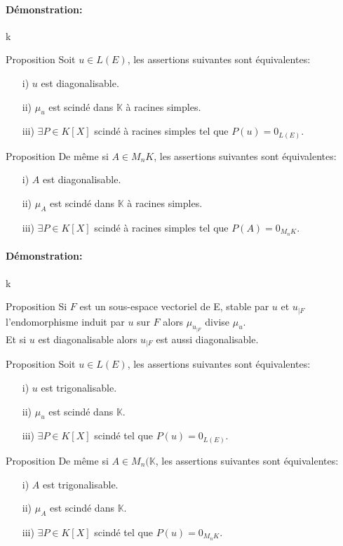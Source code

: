 \documentclass{book}
\begin{document}
\paragraph{Démonstration:}
k
\begin{Propriété}[]{Proposition}{}
Soit \(u \in L(E)\), les assertions suivantes sont équivalentes:
\begin{itemize}
    \item[i)] \(u\) est diagonalisable.
    \item[ii)] \(\mu_{u}\) est scindé dans \(\mathbb{K}\) à racines simples.
    \item[iii)] \(\exists P \in K[X]\) scindé à racines simples tel que \(P(u)=0_{L(E)}\).
\end{itemize}
\end{Propriété}
\begin{Propriété}[]{Proposition}{}
De même si \(A \in M_n{K}\), les assertions suivantes sont équivalentes:
\begin{itemize}
    \item[i)] \(A\) est diagonalisable.
    \item[ii)] \(\mu_{A}\) est scindé dans \(\mathbb{K}\) à racines simples.
    \item[iii)] \(\exists P \in K[X]\) scindé à racines simples tel que \(P(A)=0_{M_n{K}}\).
\end{itemize}
\end{Propriété}
\paragraph{Démonstration:}
k
\begin{Propriété}[]{Proposition}{}
Si \(F\) est un sous-espace vectoriel de E, stable par \(u\) et \(u_{|F}\) l'endomorphisme induit par \(u\) sur \(F\) alors \(\mu_{u_{|F}}\) divise \(\mu_{u}\).
\\ Et si \(u\) est diagonalisable alors \(u_{|F}\) est aussi diagonalisable. 
\end{Propriété}
\begin{Propriété}[]{Proposition}{}
Soit \(u \in L(E)\), les assertions suivantes sont équivalentes:
\begin{itemize}
    \item[i)] \(u\) est trigonalisable.
    \item[ii)] \(\mu_{u}\) est scindé dans \(\mathbb{K}\).
    \item[iii)] \(\exists P \in K[X]\) scindé tel que \(P(u)=0_{L(E)}\).
\end{itemize}
\end{Propriété}
\begin{Propriété}[]{Proposition}{}
De même si \(A \in M_n(\mathbb{K}\), les assertions suivantes sont équivalentes:
\begin{itemize}
    \item[i)] \(A\) est trigonalisable.
    \item[ii)] \(\mu_{A}\) est scindé dans \(\mathbb{K}\).
    \item[iii)] \(\exists P \in K[X]\) scindé tel que \(P(u)=0_{M_n{K}}\).
\end{itemize}
\end{Propriété}
\end{document}
